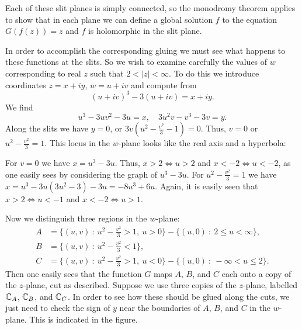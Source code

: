 \documentclass[a4paper,11pt]{article}
\begin{document}
\begin{mdframed}
  \begin{minipage}{7cm}
  \end{minipage}%
  \begin{minipage}{8cm}
    Each of these slit planes is simply connected, so the monodromy
    theorem applies to show that in each plane we can define a global
    solution $f$ to the equation $G(f(z)) = z$ and $f$ is holomorphic
    in the slit plane.
  \end{minipage}
\end{mdframed}

In order to accomplish the corresponding gluing we must see what
happens to these functions at the slits.  So we wish to examine
carefully the values of $w$ corresponding to real $z$ such that $2 <
|z| < \infty$.  To do this we introduce coordinates $z = x+iy$, $w =
u+iv$ and compute from
$$
(u+iv)^3 - 3(u+iv) = x+iy.
$$
We find
$$
u^3 - 3uv^2 - 3u = x,\quad
3u^2v-v^3-3v = y.
$$
Along the slits we have $y=0$, or $3v(u^2 - \frac{v^2}{3} - 1) = 0$.
Thus, $v=0$ or $u^2 - \frac{v^2}{3} = 1$.  This locus in the $w$-plane
looks like the real axis and a hyperbola:

\begin{mdframed}
  \vspace{3cm}
\end{mdframed}

For $v = 0$ we have $x = u^3 - 3u$.  Thus, $x>2 \Leftrightarrow u > 2$
and $x < -2 \Leftrightarrow u < -2$, as one easily sees by considering
the graph of $u^3-3u$.  For $u^2 - \frac{v^2}{3} = 1$ we have $x = u^3
- 3u(3u^2 - 3) - 3u = -8u^3 + 6u$.  Again, it is easily seen that $x >
2 \Leftrightarrow u < -1$ and $x < -2 \Leftrightarrow u > 1$.

Now we distinguish three regions in the $w$-plane:
$$
\begin{aligned}
  A &= \{(u,v) ~:~ u^2 - \frac{v^2}{3} > 1,\ u>0\}
  - \{(u,0) ~:~ 2 \le u < \infty\},\\
  B &= \{(u,v) ~:~ u^2 - \frac{v^2}{3} < 1\},\\
  C &= \{(u,v) ~:~ u^2 - \frac{v^2}{3} > 1,\ u<0\}
  - \{(u,0) ~:~ -\infty < u \le 2\}.
\end{aligned}
$$
Then one easily sees that the function $G$ maps $A$, $B$, and $C$ each
onto a copy of the $z$-plane, cut as described.  Suppose we use three
copies of the $z$-plane, labelled ${\mathbb C}_A$, ${\mathbb C}_B$, and ${\mathbb C}_C$.
In order to see how these should be glued along the cuts, we just need
to check the sign of $y$ near the boundaries of $A$, $B$, and $C$ in
the $w$-plane.  This is indicated in the figure.
\end{document}
